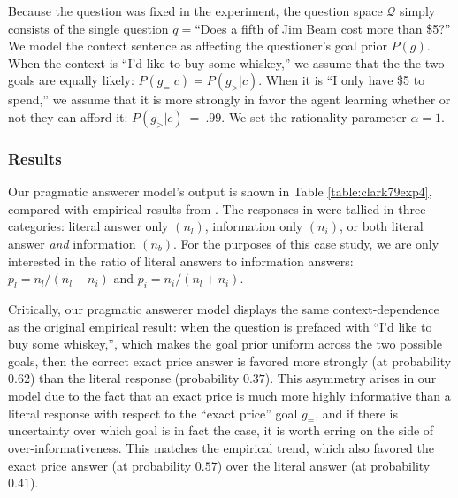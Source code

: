 \documentclass[12pt, floatsintext, jou]{apa6}
\begin{document}
Because the question was fixed in the experiment, the question space $\mathcal{Q}$ simply consists of the single question $q = $``Does a fifth of Jim Beam cost more than \$5?''  We model the context sentence as affecting the questioner's goal prior $P(g)$. When the context is ``I'd like to buy some whiskey,'' we assume that the the two goals are equally likely: $P(g_= | c) = P(g_> | c)$. When it is ``I only have \$5 to spend,'' we assume that it is more strongly in favor the agent learning whether or not they can afford it: $P(g_> | c)~=~.99$. We set the rationality parameter $\alpha = 1$.


\subsubsection{Results} 

Our pragmatic answerer model's output is shown in Table \ref{table:clark79exp4}, compared with empirical results from . The responses in  were tallied in three categories: literal answer only $(n_l)$, information only $(n_i)$, or both literal answer \emph{and} information $(n_b)$. For the purposes of this case study, we are only interested in the ratio of literal answers to information answers: $p_l = n_l/(n_l+n_i)$ and $p_i = n_i/(n_l+n_i)$.

Critically, our pragmatic answerer model displays the same context-dependence as the original empirical result: when the question is prefaced with ``I'd like to buy some whiskey,'', which makes the goal prior uniform across the two possible goals, then the correct exact price answer is favored more strongly (at probability $0.62$) than the literal response (probability $0.37$). This asymmetry arises in our model due to the fact that an exact price is much more highly informative than a literal response with respect to the ``exact price'' goal $g_=$, and if there is uncertainty over which goal is in fact the case, it is worth erring on the side of over-informativeness. This matches the empirical trend, which also favored the exact price answer (at probability $0.57$) over the literal answer (at probability $0.41$).
\end{document}
